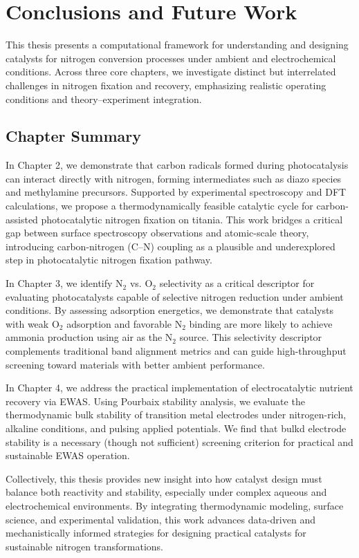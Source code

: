 
\chapter{Conclusions and Future Work}
This thesis presents a computational framework for understanding and designing catalysts for nitrogen conversion processes under ambient and electrochemical conditions. Across three core chapters, we investigate distinct but interrelated challenges in nitrogen fixation and recovery, emphasizing realistic operating conditions and theory–experiment integration.


\section{Chapter Summary}

In Chapter 2, we demonstrate that carbon radicals formed during photocatalysis can interact directly with nitrogen, forming intermediates such as diazo species and methylamine precursors. Supported by experimental spectroscopy and DFT calculations, we propose a thermodynamically feasible catalytic cycle for carbon-assisted photocatalytic nitrogen fixation on titania. This work bridges a critical gap between surface spectroscopy observations and atomic-scale theory, introducing carbon-nitrogen (C–N) coupling as a plausible and underexplored step in photocatalytic nitrogen fixation pathway.

In Chapter 3, we identify N$_2$ vs. O$_2$ selectivity as a critical descriptor for evaluating photocatalysts capable of selective nitrogen reduction under ambient conditions. By assessing adsorption energetics, we demonstrate that catalysts with weak O$_2$ adsorption and favorable N$_2$ binding are more likely to achieve ammonia production using air as the N$_2$ source. This selectivity descriptor complements traditional band alignment metrics and can guide high-throughput screening toward materials with better ambient performance.

In Chapter 4, we address the practical implementation of electrocatalytic nutrient recovery via EWAS. Using Pourbaix stability analysis, we evaluate the thermodynamic bulk stability of transition metal electrodes under nitrogen-rich, alkaline conditions, and pulsing applied potentials. We find that bulkd electrode stability is a necessary (though not sufficient) screening criterion for practical and sustainable EWAS operation.

Collectively, this thesis provides new insight into how catalyst design must balance both reactivity and stability, especially under complex aqueous and electrochemical environments. By integrating thermodynamic modeling, surface science, and experimental validation, this work advances data-driven and mechanistically informed strategies for designing practical catalysts for sustainable nitrogen transformations.


